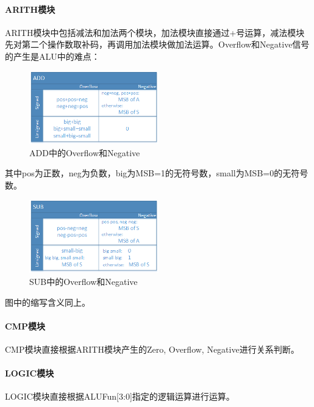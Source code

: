 \documentclass{article}
\begin{document}
            \paragraph*{ARITH模块}
            ARITH模块中包括减法和加法两个模块，加法模块直接通过+号运算，减法模块先对第二个操作数取补码，再调用加法模块做加法运算。Overflow和Negative信号的产生是ALU中的难点：
            \begin{figure}[H]
                \centering
                \includegraphics[width=0.5\textwidth]{images/add_v_n.png}
                \caption{\label{fig:add_v_n}ADD中的Overflow和Negative}
            \end{figure}
            其中pos为正数，neg为负数，big为MSB=1的无符号数，small为MSB=0的无符号数。
            
            \begin{figure}[H]
                \centering
                \includegraphics[width=0.5\textwidth]{images/sub_v_n.png}
                \caption{\label{fig:sub_v_n}SUB中的Overflow和Negative}
            \end{figure}
            图中的缩写含义同上。
            
            \paragraph*{CMP模块}
            CMP模块直接根据ARITH模块产生的Zero, Overflow, Negative进行关系判断。
            
            \paragraph*{LOGIC模块}
            LOGIC模块直接根据ALUFun[3:0]指定的逻辑运算进行运算。
            
\end{document}
